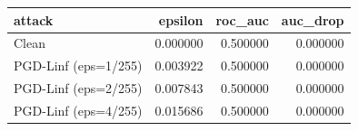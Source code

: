 \begin{tabular}{lrrr}
\toprule
attack & epsilon & roc_auc & auc_drop \\
\midrule
Clean & 0.000000 & 0.500000 & 0.000000 \\
PGD-Linf (eps=1/255) & 0.003922 & 0.500000 & 0.000000 \\
PGD-Linf (eps=2/255) & 0.007843 & 0.500000 & 0.000000 \\
PGD-Linf (eps=4/255) & 0.015686 & 0.500000 & 0.000000 \\
\bottomrule
\end{tabular}
